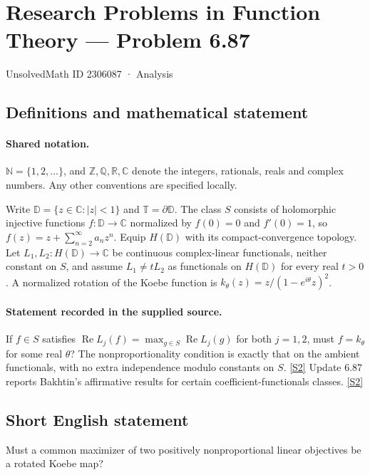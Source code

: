 \documentclass[11pt]{article}
\newcommand{\sref}[2]{\hyperlink{source:#1:#2}{[S#2]}}
\begin{document}
\setcounter{section}{2306086}
\section{Research Problems in Function Theory — Problem 6.87}\label{2306087}
{\small\sffamily UnsolvedMath ID 2306087 · Analysis}
\subsection{Definitions and mathematical statement}

\paragraph{Shared notation.}$\mathbb N=\{1,2,\ldots\}$, and $\mathbb Z,\mathbb Q,\mathbb R,\mathbb C$ denote the integers, rationals, reals and complex numbers. Any other conventions are specified locally.


Write $\mathbb D=\{z\in\mathbb C:|z|<1\}$ and $\mathbb T=\partial\mathbb D$. The class $S$ consists of holomorphic injective functions $f:\mathbb D\to\mathbb C$ normalized by $f(0)=0$ and $f'(0)=1$, so $f(z)=z+\sum_{n=2}^{\infty}a_nz^n$. Equip $H(\mathbb D)$ with its compact-convergence topology. Let $L_1,L_2:H(\mathbb D)\to\mathbb C$ be continuous complex-linear functionals, neither constant on $S$, and assume $L_1\ne tL_2$ as functionals on $H(\mathbb D)$ for every real $t>0$. A normalized rotation of the Koebe function is $k_\theta(z)=z/(1-e^{i\theta}z)^2$.
\paragraph{Statement recorded in the supplied source.}
If $f\in S$ satisfies $\operatorname{Re}L_j(f)=\max_{g\in S}\operatorname{Re}L_j(g)$ for both $j=1,2$, must $f=k_\theta$ for some real $\theta$? The nonproportionality condition is exactly that on the ambient functionals, with no extra independence modulo constants on $S$. \sref{2306087}{2}
Update 6.87 reports Bakhtin's affirmative results for certain coefficient-functionals classes. \sref{2306087}{2}
\subsection{Short English statement}
Must a common maximizer of two positively nonproportional linear objectives be a rotated Koebe map?
\end{document}
